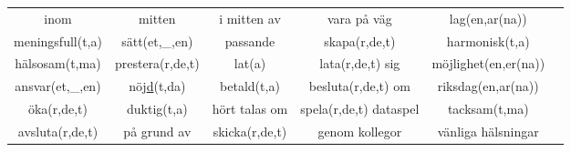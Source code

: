 \begin{center}
\begin{adjustwidth}{-2.2cm}{}
\begin{tabular}{|c c c c c c|}
            inom & mitten & i mitten av & vara på väg & lag(en,ar(na)) & \\
            meningsfull(t,a) & sätt(et,\_,en) & passande & skapa(r,de,t) & harmonisk(t,a) & \\
            hälsosam(t,ma) & prestera(r,de,t) & lat(a) & lata(r,de,t) sig & möjlighet(en,er(na)) & \\
            ansvar(et,\_,en) & nöj\underline{d}(t,da) & betald(t,a) & besluta(r,de,t) om & riksdag(en,ar(na)) & \\
            öka(r,de,t) & duktig(t,a) & hört talas om & spela(r,de,t) dataspel & tacksam(t,ma) & \\
            avsluta(r,de,t) & på grund av & skicka(r,de,t) & genom kollegor & vänliga hälsningar & \\
            \hline
        \end{tabular}
    \end{adjustwidth}
\end{center}

